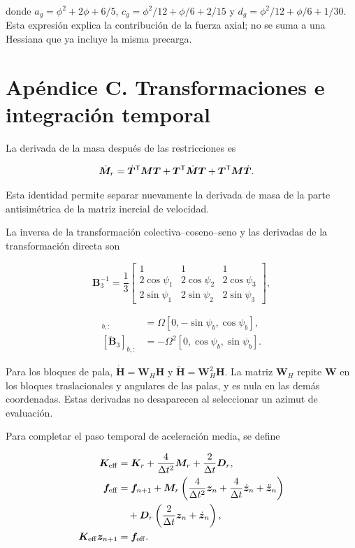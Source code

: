 donde $a_g=\phi^2+2\phi+6/5$, $c_g=\phi^2/12+\phi/6+2/15$ y $d_g=\phi^2/12+\phi/6+1/30$. Esta expresión explica la contribución de la fuerza axial; no se suma a una Hessiana que ya incluye la misma precarga.

\section{Apéndice C. Transformaciones e integración temporal}
La derivada de la masa después de las restricciones es

\begin{align}
\dot{\bm M}_r={}&\dot{\bm T}^\mathsf T\bm M\bm T+\bm T^\mathsf T\dot{\bm M}\bm T
+\bm T^\mathsf T\bm M\dot{\bm T}.
\end{align}

Esta identidad permite separar nuevamente la derivada de masa de la parte antisimétrica de la matriz inercial de velocidad.

La inversa de la transformación colectiva--coseno--seno y las derivadas de la transformación directa son

\begin{equation}
\bm B_3^{-1}=\frac13\begin{bmatrix}
1&1&1\\2\cos\psi_1&2\cos\psi_2&2\cos\psi_3\\
2\sin\psi_1&2\sin\psi_2&2\sin\psi_3
\end{bmatrix},
\end{equation}

\begin{align}
[\dot{\bm B}_3]_{b,:}&=\Omega[0,-\sin\psi_b,\cos\psi_b],\nonumber\\
[\ddot{\bm B}_3]_{b,:}&=-\Omega^2[0,\cos\psi_b,\sin\psi_b].
\end{align}

Para los bloques de pala, $\dot{\bm H}=\bm W_H\bm H$ y $\ddot{\bm H}=\bm W_H^2\bm H$. La matriz $\bm W_H$ repite $\bm W$ en los bloques traslacionales y angulares de las palas, y es nula en las demás coordenadas. Estas derivadas no desaparecen al seleccionar un azimut de evaluación.

Para completar el paso temporal de aceleración media, se define

\begin{align}
\bm K_{\rm eff}&=\bm K_r+\frac4{\Delta t^2}\bm M_r+\frac2{\Delta t}\bm D_r,\nonumber\\
\bm f_{\rm eff}&=\bm f_{n+1}
+\bm M_r\left(\frac4{\Delta t^2}\bm z_n+\frac4{\Delta t}\dot{\bm z}_n+\ddot{\bm z}_n\right)\nonumber\\
&\quad+\bm D_r\left(\frac2{\Delta t}\bm z_n+\dot{\bm z}_n\right),\nonumber\\
\bm K_{\rm eff}\bm z_{n+1}&=\bm f_{\rm eff}.
\end{align}

